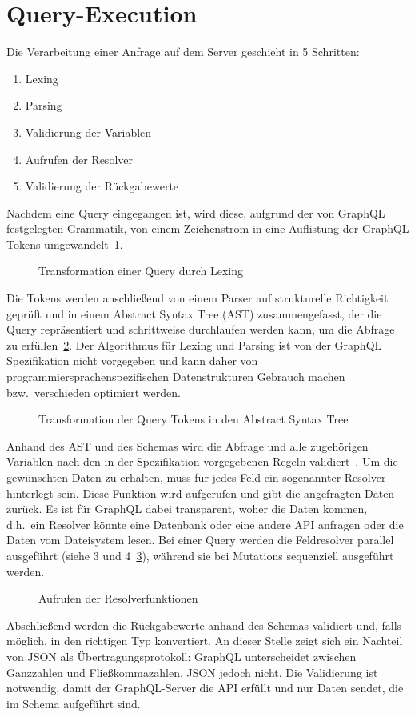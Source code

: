 \section{Query-Execution}
Die Verarbeitung einer Anfrage auf dem Server geschieht in 5 Schritten:
\begin{enumerate}
  \item Lexing
  \item Parsing
  \item Validierung der Variablen
  \item Aufrufen der Resolver
  \item Validierung der Rückgabewerte
\end{enumerate}
Nachdem eine Query eingegangen ist, wird diese, aufgrund der von GraphQL festgelegten Grammatik, von einem Zeichenstrom in eine Auflistung der GraphQL Tokens umgewandelt~\ref{img:graphql-lexing}.
\begin{figure}[h]
  \centering
  \caption{Transformation einer Query durch Lexing~\cite{JoudreyLexParse}}\label{img:graphql-lexing}
\end{figure}
Die Tokens werden anschließend von einem Parser auf strukturelle Richtigkeit geprüft und in einem Abstract Syntax Tree (AST) zusammengefasst, der die Query repräsentiert und schrittweise durchlaufen werden kann, um die Abfrage zu erfüllen~\ref{img:graphql-parsing}.
Der Algorithmus für Lexing und Parsing ist von der GraphQL Spezifikation nicht vorgegeben und kann daher von programmiersprachenspezifischen Datenstrukturen Gebrauch machen bzw.\ verschieden optimiert werden.
\begin{figure}[h]
  \centering
  \caption{Transformation der Query Tokens in den Abstract Syntax Tree~\cite{JoudreyLexParse}}\label{img:graphql-parsing}
\end{figure}
Anhand des AST und des Schemas wird die Abfrage und alle zugehörigen Variablen nach den in der Spezifikation vorgegebenen Regeln validiert~\cite[vgl.][]{JoudreyLexParse}.
Um die gewünschten Daten zu erhalten, muss für jedes Feld ein sogenannter Resolver hinterlegt sein.
Diese Funktion wird aufgerufen und gibt die angefragten Daten zurück.
Es ist für GraphQL dabei transparent, woher die Daten kommen, d.h.\ ein Resolver könnte eine Datenbank oder eine andere API anfragen oder die Daten vom Dateisystem lesen.
Bei einer Query werden die Feldresolver parallel ausgeführt (siehe 3 und 4~\ref{img:graphql-execution}), während sie bei Mutations sequenziell ausgeführt werden.
\begin{figure}[h]
  \centering
  \caption{Aufrufen der Resolverfunktionen~\cite{BurkN}}\label{img:graphql-execution}
\end{figure}
Abschließend werden die Rückgabewerte anhand des Schemas validiert und, falls möglich, in den richtigen Typ konvertiert.
An dieser Stelle zeigt sich ein Nachteil von JSON als Übertragungsprotokoll: GraphQL unterscheidet zwischen Ganzzahlen und Fließkommazahlen, JSON jedoch nicht.
Die Validierung ist notwendig, damit der GraphQL-Server die API erfüllt und nur Daten sendet, die im Schema aufgeführt sind.
